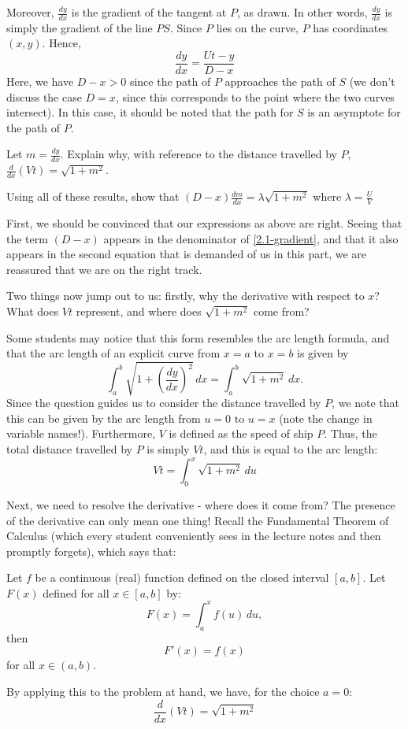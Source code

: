 \documentclass[../main.tex]{subfiles}
\begin{document}
Moreover, $\frac{dy}{dx}$ is the gradient of the tangent at $P$, as drawn. In other words, $\frac{dy}{dx}$ is simply the gradient of the line $PS$. Since $P$ lies on the curve, $P$ has coordinates $(x, y)$. Hence,
\begin{equation} \label{2.1-gradient}
    \frac{dy}{dx}=\frac{Ut-y}{D-x}
\end{equation}
Here, we have $D-x > 0$ since the path of $P$ approaches the path of $S$ (we don't discuss the case $D=x$, since this corresponds to the point where the two curves intersect). In this case, it should be noted that the path for $S$ is an asymptote for the path of $P$.  
\begin{example}[cont.]\label{pursuit-curve:results}
Let $m=\frac{dy}{dx}$. Explain why, with reference to the distance travelled by $P$, $\frac{d}{dx}(Vt)=\sqrt{1+m^2}$.

Using all of these results, show that $(D-x)\frac{dm}{dx}=\lambda\sqrt{1+m^2}$ where $\lambda=\frac{U}{V}$
\end{example}
First, we should be convinced that our expressions as above are right. Seeing that the term $(D-x)$ appears in the denominator of \eqref{2.1-gradient}, and that it also appears in the second equation that is demanded of us in this part, we are reassured that we are on the right track.

Two things now jump out to us: firstly, why the derivative with respect to $x$? What does $Vt$ represent, and where does $\sqrt{1+m^2}$ come from?

Some students may notice that this form resembles the arc length formula, and that the arc length of an explicit curve from $x=a$ to $x=b$ is given by
$$\int_{a}^{b}\sqrt{1+\left(\frac{dy}{dx}\right)^2} \,dx =\int_{a}^{b}\sqrt{1+m^2} \,dx .$$
Since the question guides us to consider the distance travelled by $P$, we note that this can be given by the arc length from $u=0$ to $u=x$ (note the change in variable names!). Furthermore, $V$ is defined as the speed of ship $P$. Thus, the total distance travelled by $P$ is simply $Vt$, and this is equal to the arc length:
$$Vt=\int_{0}^{x}\sqrt{1+m^2} \,du$$

Next, we need to resolve the derivative - where does it come from? The presence of the derivative can only mean one thing! Recall the Fundamental Theorem of Calculus (which every student conveniently sees in the lecture notes and then promptly forgets), which says that: 
\begin{theorem}
Let $f$ be a continuous (real) function defined on the closed interval $[a,b]$. Let $F(x)$ defined for all $x\in[a,b]$ by:
$$F(x)=\int_a^x f(u)\,du,$$ then $$F'(x)=f(x)$$ for all $x \in (a, b)$. 
\end{theorem}
By applying this to the problem at hand, we have, for the choice $a=0$:
\begin{equation}\label{2.1-distance}
    \frac{d}{dx}(Vt)=\sqrt{1+m^2}
\end{equation}
\end{document}
